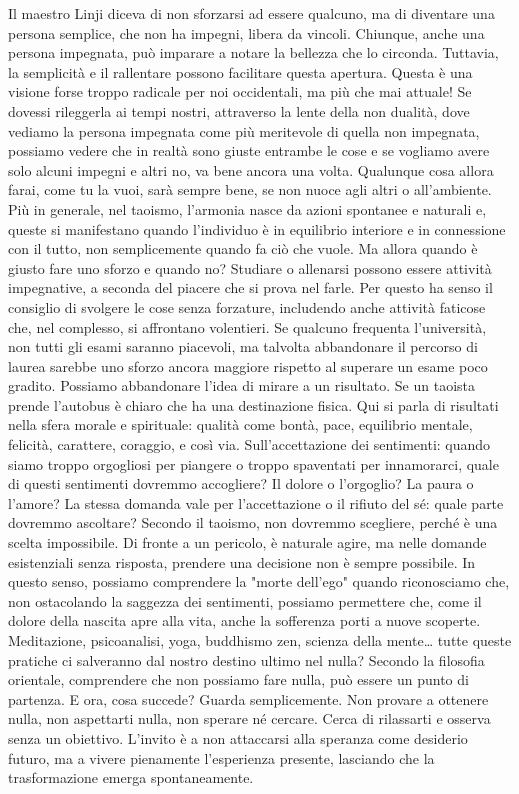 \documentclass[12pt]{book} %
\begin{document}
Il maestro Linji diceva di non sforzarsi ad essere qualcuno, ma di diventare una persona semplice, che non ha impegni, libera da vincoli. Chiunque, anche una persona impegnata, può imparare a notare la bellezza che lo circonda. Tuttavia, la semplicità e il rallentare possono facilitare questa apertura. Questa è una visione forse troppo radicale per noi occidentali, ma più che mai attuale! Se dovessi rileggerla ai tempi nostri, attraverso la lente della non dualità, dove vediamo la persona impegnata come più meritevole di quella non impegnata, possiamo vedere che in realtà sono giuste entrambe le cose e se vogliamo avere solo alcuni impegni e altri no, va bene ancora una volta.
Qualunque cosa allora farai, come tu la vuoi, sarà sempre bene, se non nuoce agli altri o all'ambiente. Più in generale, nel taoismo, l’armonia nasce da azioni spontanee e naturali e, queste si manifestano quando l’individuo è in equilibrio interiore e in connessione con il tutto, non semplicemente quando fa ciò che vuole.
Ma allora quando è giusto fare uno sforzo e quando no? Studiare o allenarsi possono essere attività impegnative, a seconda del piacere che si prova nel farle. Per questo ha senso il consiglio di svolgere le cose senza forzature, includendo anche attività faticose che, nel complesso, si affrontano volentieri. Se qualcuno frequenta l'università, non tutti gli esami saranno piacevoli, ma talvolta abbandonare il percorso di laurea sarebbe uno sforzo ancora maggiore rispetto al superare un esame poco gradito.
Possiamo abbandonare l'idea di mirare a un risultato. Se un taoista prende l'autobus è chiaro che ha una destinazione fisica. Qui si parla di risultati nella sfera morale e spirituale: qualità come bontà, pace, equilibrio mentale, felicità, carattere, coraggio, e così via.
Sull'accettazione dei sentimenti: quando siamo troppo orgogliosi per piangere o troppo spaventati per innamorarci, quale di questi sentimenti dovremmo accogliere? Il dolore o l'orgoglio? La paura o l'amore?
La stessa domanda vale per l'accettazione o il rifiuto del sé: quale parte dovremmo ascoltare? Secondo il taoismo, non dovremmo scegliere, perché è una scelta impossibile. Di fronte a un pericolo, è naturale agire, ma nelle domande esistenziali senza risposta, prendere una decisione non è sempre possibile.
In questo senso, possiamo comprendere la "morte dell'ego" quando riconosciamo che, non ostacolando la saggezza dei sentimenti, possiamo permettere che, come il dolore della nascita apre alla vita, anche la sofferenza porti a nuove scoperte.
Meditazione, psicoanalisi, yoga, buddhismo zen, scienza della mente… tutte queste pratiche ci salveranno dal nostro destino ultimo nel nulla? Secondo la filosofia orientale, comprendere che non possiamo fare nulla, può essere un punto di partenza. E ora, cosa succede? Guarda semplicemente. Non provare a ottenere nulla, non aspettarti nulla, non sperare né cercare. Cerca di rilassarti e osserva senza un obiettivo. L’invito è a non attaccarsi alla speranza come desiderio futuro, ma a vivere pienamente l’esperienza presente, lasciando che la trasformazione emerga spontaneamente.
\end{document}
